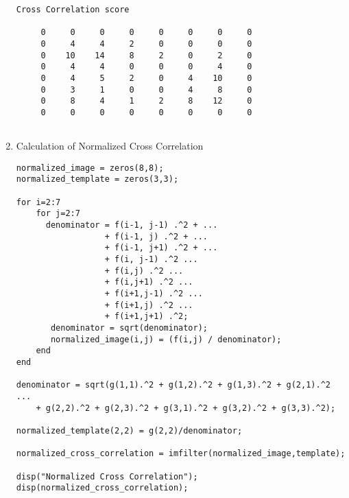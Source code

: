 \documentclass{article}
\begin{document}
\begin{enumerate}
\begin{verbatim}
Cross Correlation score

     0     0     0     0     0     0     0     0
     0     4     4     2     0     0     0     0
     0    10    14     8     2     0     2     0
     0     4     4     0     0     0     4     0
     0     4     5     2     0     4    10     0
     0     3     1     0     0     4     8     0
     0     8     4     1     2     8    12     0
     0     0     0     0     0     0     0     0
     
  \end{verbatim}

\item Calculation of Normalized Cross Correlation

  \begin{verbatim}
normalized_image = zeros(8,8);
normalized_template = zeros(3,3);

for i=2:7
    for j=2:7
      denominator = f(i-1, j-1) .^2 + ...
                  + f(i-1, j) .^2 + ...
                  + f(i-1, j+1) .^2 + ...
                  + f(i, j-1) .^2 ...
                  + f(i,j) .^2 ...
                  + f(i,j+1) .^2 ...
                  + f(i+1,j-1) .^2 ...
                  + f(i+1,j) .^2 ...
                  + f(i+1,j+1) .^2;
       denominator = sqrt(denominator);
       normalized_image(i,j) = (f(i,j) / denominator);
    end
end

denominator = sqrt(g(1,1).^2 + g(1,2).^2 + g(1,3).^2 + g(2,1).^2 ...
    + g(2,2).^2 + g(2,3).^2 + g(3,1).^2 + g(3,2).^2 + g(3,3).^2);

normalized_template(2,2) = g(2,2)/denominator;
    
normalized_cross_correlation = imfilter(normalized_image,template);

disp("Normalized Cross Correlation");
disp(normalized_cross_correlation);
\end{verbatim}

\end{enumerate}    
\end{document}
